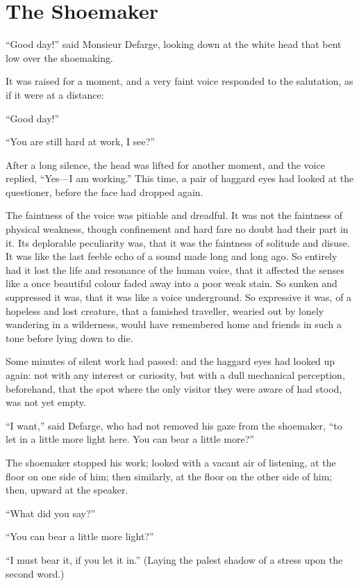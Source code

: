 \chapter{The Shoemaker}


``Good day!'' said Monsieur Defarge, looking down at the white head
that bent low over the shoemaking.

It was raised for a moment, and a very faint voice responded to the
salutation, as if it were at a distance:

``Good day!''

``You are still hard at work, I see?''

After a long silence, the head was lifted for another moment, and the
voice replied, ``Yes---I am working.''  This time, a pair of haggard eyes
had looked at the questioner, before the face had dropped again.

The faintness of the voice was pitiable and dreadful.  It was not the
faintness of physical weakness, though confinement and hard fare no
doubt had their part in it.  Its deplorable peculiarity was, that it
was the faintness of solitude and disuse.  It was like the last
feeble echo of a sound made long and long ago.  So entirely had it
lost the life and resonance of the human voice, that it affected the
senses like a once beautiful colour faded away into a poor weak
stain.  So sunken and suppressed it was, that it was like a voice
underground.  So expressive it was, of a hopeless and lost creature,
that a famished traveller, wearied out by lonely wandering in a
wilderness, would have remembered home and friends in such a tone
before lying down to die.

Some minutes of silent work had passed:  and the haggard eyes had
looked up again:  not with any interest or curiosity, but with a dull
mechanical perception, beforehand, that the spot where the only
visitor they were aware of had stood, was not yet empty.

``I want,'' said Defarge, who had not removed his gaze from the
shoemaker, ``to let in a little more light here.  You can bear a
little more?''

The shoemaker stopped his work; looked with a vacant air of listening,
at the floor on one side of him; then similarly, at the floor on the
other side of him; then, upward at the speaker.

``What did you say?''

``You can bear a little more light?''

``I must bear it, if you let it in.''  (Laying the palest shadow of a
stress upon the second word.)

